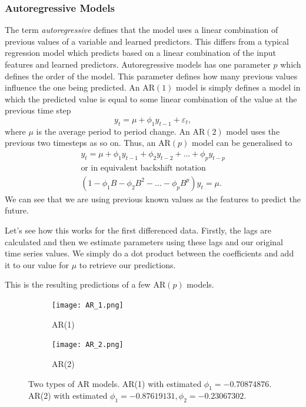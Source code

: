 \documentclass{article}
\begin{document}
  \subsubsection{Autoregressive Models}
    The term \emph{autoregressive} defines that the model uses a linear combination of previous values of a variable and learned predictors. This differs from a typical regression model which predicts based on a linear combination of the input features and learned predictors.
    Autoregressive models has one parameter $p$ which defines the order of the model. This parameter defines how many previous values influence the one being predicted. 
    An AR$(1)$ model is simply defines a model in which the predicted value is equal to some linear combination of the value at the previous time step
    \begin{equation*}
      y_t = \mu + \phi_1 y_{t-1} + \varepsilon_t,
    \end{equation*}
    where $\mu$ is the average period to period change.
    An AR$(2)$ model uses the previous two timesteps as so on.
    Thus, an AR$(p)$ model can be generalised to
    \begin{gather*}
      y_t = \mu + \phi_1 y_{t-1} + \phi_2 y_{t-2} + ... + \phi_p y_{t-p}\\
      \text{or in equivalent backshift notation}\\
      (1 - \phi_1B - \phi_2B^2 - ... - \phi_pB^p)y_t = \mu.
    \end{gather*}
    We can see that we are using previous known values as the features to predict the future.

    Let's see how this works for the first differenced data. Firstly, the lags are calculated and then we estimate parameters using these lags and our original time series values. We simply do a dot product between the coefficients and add it to our value for $\mu$ to retrieve our predictions. 
    
    This is the resulting predictions of a few AR$(p)$ models.

    \begin{figure}[H]
      \centering
      \captionsetup{justification=centering}
      \begin{subfigure}[b]{0.49\linewidth}
        \texttt{[image: AR\_1.png]}
        \caption{AR(1)}
      \end{subfigure}
      \begin{subfigure}[b]{0.49\linewidth}
        \texttt{[image: AR\_2.png]}
        \caption{AR(2)}
      \end{subfigure}
      \caption{Two types of AR models. AR(1) with estimated $\phi_1 = -0.70874876$. AR(2) with estimated $\phi_1 = -0.87619131, \phi_2 = -0.23067302$.}
    \end{figure}
\end{document}
